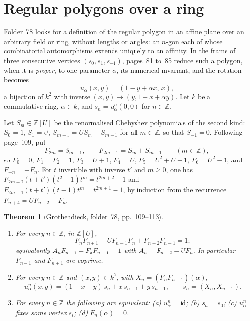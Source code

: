 \documentclass[11pt,a4paper]{amsart}
\newtheorem{theorem}{Theorem}[section]
\theoremstyle{definition}
\theoremstyle{remark}
\newcommand{\Z}{\mathbb Z}
\newcommand{\id}{\mathrm{id}}
\newcommand{\fac}[1]{\href{https://grothendieck.umontpellier.fr/#1.pdf}{folder~#1}}
\begin{document}
\section{Regular polygons over a ring}\label{sec:poly}

Folder~78 looks for a definition of the regular polygon in an affine plane over an arbitrary field or ring, without lengths or angles: an $n$-gon each of whose combinatorial automorphisms extends uniquely to an affinity. In the frame of three consecutive vertices $(s_0, s_1, s_{-1})$, pages~81 to~85 reduce such a polygon, when it is \emph{proper}, to one parameter $\alpha$, its numerical invariant, and the rotation becomes
\[
u_\alpha(x, y) = (1 - y + \alpha x,\ x),
\]
a bijection of $k^2$ with inverse $(x, y) \mapsto (y, 1 - x + \alpha y)$. Let $k$ be a commutative ring, $\alpha \in k$, and $s_n = u_\alpha^n(0,0)$ for $n \in \Z$.

Let $S_m \in \Z[U]$ be the renormalised Chebyshev polynomials of the second kind: $S_0 = 1$, $S_1 = U$, $S_{m+1} = US_m - S_{m-1}$ for all $m \in \Z$, so that $S_{-1} = 0$. Following page~109, put
\[
F_{2m} = S_{m-1}, \qquad F_{2m+1} = S_m + S_{m-1} \qquad (m \in \Z),
\]
so $F_0 = 0$, $F_1 = F_2 = 1$, $F_3 = U + 1$, $F_4 = U$, $F_5 = U^2 + U - 1$, $F_6 = U^2 - 1$, and $F_{-n} = -F_n$. For $t$ invertible with inverse $t'$ and $m \ge 0$, one has $F_{2m+2}(t + t')(t^2 - 1)t^m = t^{2m+2} - 1$ and $F_{2m+1}(t + t')(t - 1)t^m = t^{2m+1} - 1$, by induction from the recurrence $F_{n+4} = UF_{n+2} - F_n$.

\begin{theorem}[Grothendieck, \fac{78}, pp.~109--113]\label{thm:closure}
\leavevmode
\begin{enumerate}
\item For every $n \in \Z$, in $\Z[U]$,
\[
F_nF_{n+1} - UF_{n-1}F_n + F_{n-2}F_{n-1} = 1;
\]
equivalently $A_nF_{n-1} + F_nF_{n+1} = 1$ with $A_n = F_{n-2} - UF_n$. In particular $F_{n-1}$ and $F_{n+1}$ are coprime.
\item For every $n \in \Z$ and $(x, y) \in k^2$, with $X_n = (F_nF_{n+1})(\alpha)$,
\[
u_\alpha^n(x, y) = (1 - x - y)\,s_n + x\,s_{n+1} + y\,s_{n-1}, \qquad s_n = (X_n, X_{n-1}).
\]
\item For every $n \in \Z$ the following are equivalent: (a) $u_\alpha^n = \id$; (b) $s_n = s_0$; (c) $u_\alpha^n$ fixes some vertex $s_i$; (d) $F_n(\alpha) = 0$.
\end{enumerate}
\end{theorem}
\end{document}
